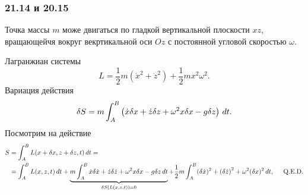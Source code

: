 \subsubsection*{21.14 и 20.15}

Точка массы $m$ може двигаться по гладкой вертикальной плоскости $xz$, вращающейчя вокруг векртикальной оси $Oz$ с постоянной угловой скоростью $\omega$. 

Лагранжиан системы
\begin{equation}
    L = \frac{1}{2} m \left(
        \dot{x}^2 + \dot{z}^2
    \right) + 
    \frac{1}{2} m x^2 \omega^2.
\end{equation}
Вариация действия
\begin{equation*}
    \delta S = m \int_{A}^{B} \left(
        \dot{x} \delta x + \dot{z} \delta z + \omega^2 x \delta x - g \delta z
    \right) \, d t.
\end{equation*}
Посмотрим на действие
\begin{align*}
    S 
    &= \int_{A}^{B} 
    L(x+\delta x, z + \delta z, t) \, d t = \\
    &= \int_{A}^{B}
    L(x, z, t) \, d t + 
    \underbrace{
    m \int_{A}^{B} \dot{x} \delta \dot{x} + \dot{z} \delta \dot{z} + \omega^2 x \delta x - g \delta z \, d t
    }_{\delta S (L(x, z, t)) = 0} +
    \frac{1}{2} m \int_{A}^{B}
     (\delta \dot{x})^2 + \left(\delta \dot{z}\right)^2 + \omega^2
     (\delta x)^2 \, d t, \hspace{0.5cm} \text{Q.E.D.}
\end{align*}
